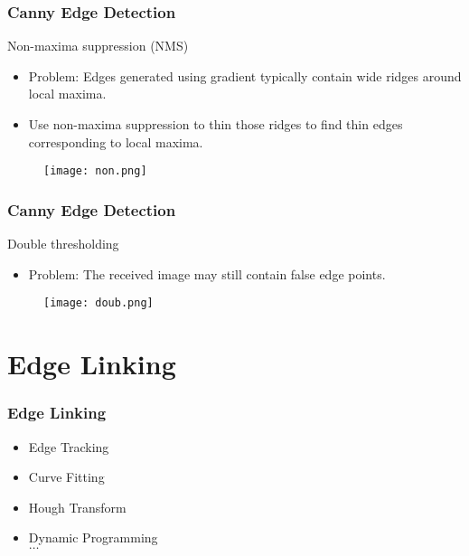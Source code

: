 \documentclass[notheorems,serif,table,compress]{beamer}  %
\begin{document}
\begin{frame}
\frametitle{Canny Edge Detection}
Non-maxima suppression (NMS)
\begin{itemize}
\item Problem: Edges generated using gradient typically contain wide ridges around local maxima.
\item Use non-maxima suppression to thin those ridges to find thin edges corresponding to local maxima.
\end{itemize}
    \begin{figure}
    \texttt{[image: non.png]} 
    \end{figure}
\end{frame}

\begin{frame}
\frametitle{Canny Edge Detection}
Double thresholding
\begin{itemize}
\item Problem: The received image may still contain false edge points.
\end{itemize}
    \begin{figure}
    \texttt{[image: doub.png]} 
    \end{figure}
\end{frame}

\section{Edge Linking}

\begin{frame}
\frametitle{Edge Linking}
    \begin{itemize}
    \item Edge Tracking
    \item Curve Fitting
    \item Hough Transform
    \item Dynamic Programming\\
    $\dots$
    \end{itemize}
\end{frame}
  
\end{document}
